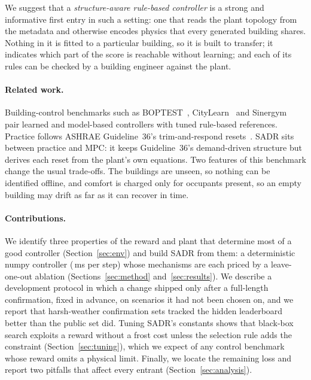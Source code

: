 We suggest that a \emph{structure-aware rule-based controller} is a strong and informative first entry in such a setting: one that reads the plant topology from the metadata and otherwise encodes physics that every generated building shares. Nothing in it is fitted to a particular building, so it is built to transfer; it indicates which part of the score is reachable without learning; and each of its rules can be checked by a building engineer against the plant.

\paragraph{Related work.} Building-control benchmarks such as BOPTEST~\citep{blum2021boptest}, CityLearn~\citep{vazquezcanteli2019citylearn} and Sinergym~\citep{jimenezraboso2021sinergym} pair learned and model-based controllers with tuned rule-based references. Practice follows ASHRAE Guideline~36's trim-and-respond resets~\citep{ashrae2021g36,taylor2018vav}. SADR sits between practice and MPC: it keeps Guideline~36's demand-driven structure but derives each reset from the plant's own equations. Two features of this benchmark change the usual trade-offs. The buildings are unseen, so nothing can be identified offline, and comfort is charged only for occupants present, so an empty building may drift as far as it can recover in time.

\paragraph{Contributions.} We identify three properties of the reward and plant that determine most of a good controller (Section~\ref{sec:env}) and build SADR from them: a deterministic numpy controller (\PolicyMsOurs{}\,ms per step) whose mechanisms are each priced by a leave-one-out ablation (Sections~\ref{sec:method} and~\ref{sec:results}). We describe a development protocol in which a change shipped only after a full-length confirmation, fixed in advance, on scenarios it had not been chosen on, and we report that harsh-weather confirmation sets tracked the hidden leaderboard better than the public set did. Tuning SADR's constants shows that black-box search exploits a reward without a frost cost unless the selection rule adds the constraint (Section~\ref{sec:tuning}), which we expect of any control benchmark whose reward omits a physical limit. Finally, we locate the remaining loss and report two pitfalls that affect every entrant (Section~\ref{sec:analysis}).

